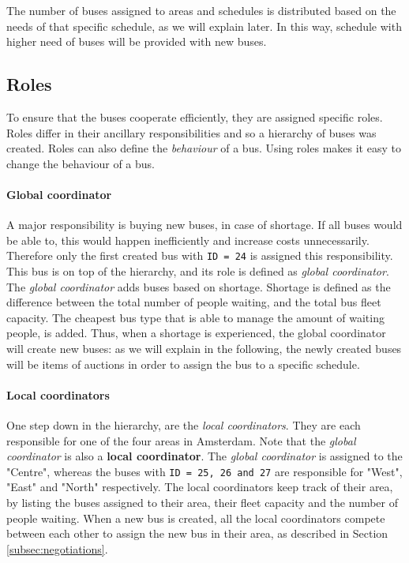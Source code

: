 \documentclass[a4paper]{article}
\begin{document}
The number of buses assigned to areas and schedules is distributed based on the needs of that specific schedule, as we will explain later. In this way, schedule with higher need of buses will be provided with new buses.

\subsection{Roles}
\label{subsec:roles}
To ensure that the buses cooperate efficiently, they are assigned specific roles. Roles differ in their ancillary responsibilities and so a hierarchy of buses was created. 
\newline
Roles can also define the \textit{behaviour} of a bus. Using roles makes it easy to change the behaviour of a bus. 
\paragraph{Global coordinator}
A major responsibility is buying new buses, in case of shortage. If all buses would be able to, this would happen inefficiently and increase costs unnecessarily. Therefore only the first created bus with \texttt{ID = 24} is assigned this responsibility. This bus is on top of the hierarchy, and its role is defined as \textit{global coordinator}. 
\newline
The \textit{global coordinator} adds buses based on shortage. Shortage is defined as the difference between the total number of people waiting, and the total bus fleet capacity. The cheapest bus type that is able to manage the amount of waiting people, is added. Thus, when a shortage is experienced, the global coordinator will create new buses: as we will explain in the following, the newly created buses will be items of auctions in order to assign the bus to a specific schedule.

\paragraph{Local coordinators}
One step down in the hierarchy, are the \textit{local coordinators}. They are each responsible for one of the four areas in Amsterdam. Note that the \textit{global coordinator} is also a \textbf{local coordinator}. The \textit{global coordinator} is assigned to the "Centre", whereas the buses with \texttt{ID = 25, 26 and 27} are responsible for "West", "East" and "North" respectively. The local coordinators keep track of their area, by listing the buses assigned to their area, their fleet capacity and the number of people waiting. When a new bus is created, all the local coordinators compete between each other to assign the new bus in their area, as described in Section \ref{subsec:negotiations}.
\end{document}
